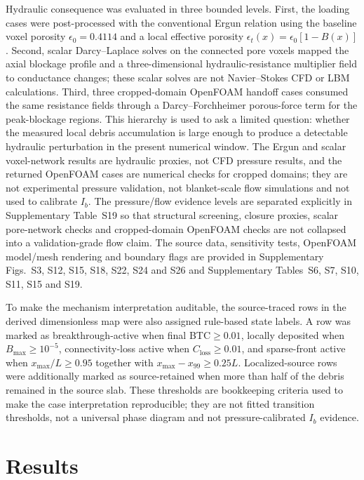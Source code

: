 \documentclass[preprint,12pt,authoryear]{elsarticle}
\newcommand{\BTC}{BTC\xspace}
\newcommand{\Ib}{$I_b$\xspace}
\begin{document}
Hydraulic consequence was evaluated in three bounded levels. First, the loading cases were post-processed with the conventional Ergun relation using the baseline voxel porosity $\epsilon_0 = 0.4114$ and a local effective porosity $\epsilon_t(x)=\epsilon_0[1-B(x)]$. Second, scalar Darcy--Laplace solves on the connected pore voxels mapped the axial blockage profile and a three-dimensional hydraulic-resistance multiplier field to conductance changes; these scalar solves are not Navier--Stokes CFD or LBM calculations. Third, three cropped-domain OpenFOAM handoff cases consumed the same resistance fields through a Darcy--Forchheimer porous-force term for the peak-blockage regions. This hierarchy is used to ask a limited question: whether the measured local debris accumulation is large enough to produce a detectable hydraulic perturbation in the present numerical window. The Ergun and scalar voxel-network results are hydraulic proxies, not CFD pressure results, and the returned OpenFOAM cases are numerical checks for cropped domains; they are not experimental pressure validation, not blanket-scale flow simulations and not used to calibrate \Ib. The pressure/flow evidence levels are separated explicitly in Supplementary Table~S19 so that structural screening, closure proxies, scalar pore-network checks and cropped-domain OpenFOAM checks are not collapsed into a validation-grade flow claim. The source data, sensitivity tests, OpenFOAM model/mesh rendering and boundary flags are provided in Supplementary Figs.~S3, S12, S15, S18, S22, S24 and S26 and Supplementary Tables~S6, S7, S10, S11, S15 and S19.

To make the mechanism interpretation auditable, the source-traced rows in the derived dimensionless map were also assigned rule-based state labels. A row was marked as breakthrough-active when final \BTC $\geq 0.01$, locally deposited when $B_{\max}\geq10^{-5}$, connectivity-loss active when $C_{\mathrm{loss}}\geq0.01$, and sparse-front active when $x_{\max}/L\geq0.95$ together with $x_{\max}-x_{99}\geq0.25L$. Localized-source rows were additionally marked as source-retained when more than half of the debris remained in the source slab. These thresholds are bookkeeping criteria used to make the case interpretation reproducible; they are not fitted transition thresholds, not a universal phase diagram and not pressure-calibrated \Ib evidence.

\section{Results}
\end{document}

